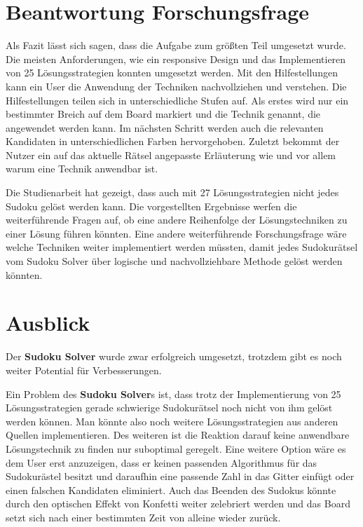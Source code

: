 \section{Beantwortung Forschungsfrage}

Als Fazit lässt sich sagen, dass die Aufgabe zum größten Teil umgesetzt wurde. Die meisten Anforderungen, wie ein responsive Design und das Implementieren von 25 Lösungsstrategien konnten umgesetzt werden. Mit den Hilfestellungen kann ein User die Anwendung der Techniken nachvollziehen und verstehen. Die Hilfestellungen teilen sich in unterschiedliche Stufen auf. Als erstes wird nur ein bestimmter Breich auf dem Board markiert und die Technik genannt, die angewendet werden kann. Im nächsten Schritt werden auch die relevanten Kandidaten in unterschiedlichen Farben hervorgehoben. Zuletzt bekommt der Nutzer ein auf das aktuelle Rätsel angepasste Erläuterung wie und vor allem warum eine Technik anwendbar ist.

Die Studienarbeit hat gezeigt, dass auch mit 27 Lösungsstrategien nicht jedes Sudoku gelöst werden kann. Die vorgestellten Ergebnisse werfen die weiterführende Fragen auf, ob eine andere Reihenfolge der Lösungstechniken zu einer Lösung führen könnten. Eine andere weiterführende Forschungsfrage wäre welche Techniken weiter implementiert werden müssten, damit jedes Sudokurätsel vom Sudoku Solver über logische und nachvollziehbare Methode gelöst werden könnten.

\section{Ausblick}

Der \textbf{Sudoku Solver} wurde zwar erfolgreich umgesetzt, trotzdem gibt es noch weiter Potential für Verbesserungen.

Ein Problem des \textbf{Sudoku Solver}s ist, dass trotz der Implementierung von 25 Lösungsstrategien gerade schwierige Sudokurätsel noch nicht von ihm gelöst werden können. Man könnte also noch weitere Lösungsstrategien aus anderen Quellen implementieren. Des weiteren ist die Reaktion darauf keine anwendbare Lösungstechnik zu finden nur suboptimal geregelt. Eine weitere Option wäre es dem User erst anzuzeigen, dass er keinen passenden Algorithmus für das Sudokurästel besitzt und daraufhin eine passende Zahl in das Gitter einfügt oder einen falschen Kandidaten eliminiert. Auch das Beenden des Sudokus könnte durch den optischen Effekt von Konfetti weiter zelebriert werden und das Board setzt sich nach einer bestimmten Zeit von alleine wieder zurück. 

